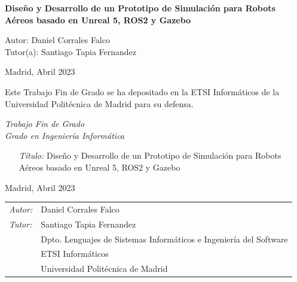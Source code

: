 \begin{titlepage}
\vspace*{0.5cm}
\begin{center}
\huge\bfseries { Diseño y Desarrollo de un Prototipo de Simulación para Robots Aéreos basado en Unreal 5, ROS2 y Gazebo} 
\end{center}

\vspace*{5cm}

\noindent
\large{Autor: Daniel Corrales Falco }\\
\large{Tutor(a): Santiago Tapia Fernandez }


\vspace*{3cm}
\begin{center}
Madrid, Abril 2023
\end{center}

\newpage
\thispagestyle{empty}
\noindent
Este Trabajo Fin de Grado se ha depositado en la ETSI Informáticos de la Universidad Politécnica de Madrid para su defensa.

\vspace*{4cm}
\noindent
\textit{Trabajo Fin de Grado}\\
\textit{Grado en Ingeniería Informática} 

\begin{enumerate}
\item[\textit{Título:}]  Diseño y Desarrollo de un Prototipo de Simulación para Robots Aéreos basado en Unreal 5, ROS2 y Gazebo
\end{enumerate}
Madrid, Abril 2023


\vspace*{3cm}

\noindent
\begin{tabular}{ll}
\textit{Autor:} & Daniel Corrales Falco \\ 
\textit{Tutor:} &  Santiago Tapia Fernandez  \\ 
                & Dpto. Lenguajes de Sistemas Informáticos e Ingeniería del Software \\
                & ETSI Informáticos\\
                & Universidad Politécnica de Madrid
\end{tabular} 

\end{titlepage}
